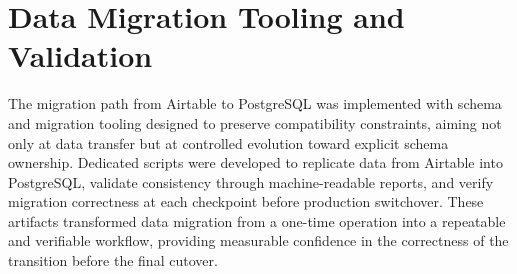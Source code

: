 \section{Data Migration Tooling and Validation}
The migration path from Airtable to PostgreSQL was implemented with schema and migration tooling designed to preserve compatibility constraints, aiming not only at data transfer but at controlled evolution toward explicit schema ownership. Dedicated scripts were developed to replicate data from Airtable into PostgreSQL, validate consistency through machine-readable reports, and verify migration correctness at each checkpoint before production switchover. These artifacts transformed data migration from a one-time operation into a repeatable and verifiable workflow, providing measurable confidence in the correctness of the transition before the final cutover.
